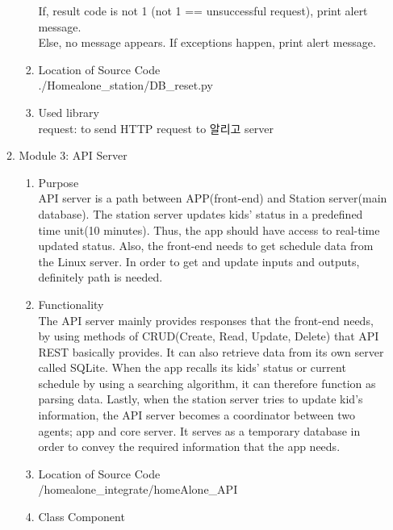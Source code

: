 \documentclass[conference]{IEEEtran}
\begin{document}
\begin{enumerate}[label=\arabic*.]
\begin{enumerate}[label=\arabic*.]
\begin{enumerate}[label=\alph*.]
        If, result code is not 1 (not 1 == unsuccessful request), print alert message.\\
        Else, no message appears. If exceptions happen, print alert message.\\
        \item {\large{Location of Source Code}}\\
        ./Homealone\_station/DB\_reset.py\\
        \item {\large{Used library}} \\
        request: to send HTTP request to 알리고 server \\
    \end{enumerate}  
    \item {\large{Module 3: API Server}} \\
    \begin{enumerate}[label=\alph*.]
        \item{\large{Purpose}}\\
        API server is a path between APP(front-end) and Station server(main database).  The station server updates kids' status in a predefined time unit(10 minutes). Thus, the app should have access to real-time updated status. Also, the front-end needs to get schedule data from the Linux server. In order to get and update inputs and outputs, definitely path is needed.\\
        \item{\large{Functionality}}\\
        The API server mainly provides responses that the front-end needs, by using methods of CRUD(Create, Read, Update, Delete) that API REST basically provides. It can also retrieve data from its own server called SQLite. When the app recalls its kids' status or current schedule by using a searching algorithm, it can therefore function as parsing data. Lastly, when the station server tries to update kid’s information, the API server becomes a coordinator between two agents; app and core server. It serves as a temporary database in order to convey the required information that the app needs.\\
        \item{\large{Location of Source Code}}\\
        /homealone\_integrate/homeAlone\_API\\
        \item{\large{Class Component}}\\
        \begin{enumerate}[label=\roman*.]

\end{enumerate}
\end{enumerate}
\end{enumerate}
\end{enumerate}
\end{document}
